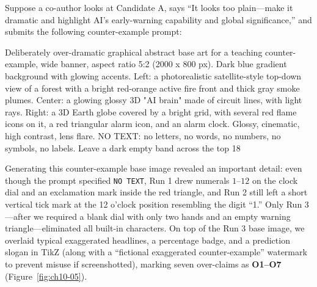 Suppose a co-author looks at Candidate A, says ``It looks too plain---make it dramatic and highlight AI's early-warning capability and global significance,'' and submits the following counter-example prompt:

\begin{Prompt}
Deliberately over-dramatic graphical abstract base art for a teaching
counter-example, wide banner, aspect ratio 5:2 (2000 x 800 px).
Dark blue gradient background with glowing accents.
Left: a photorealistic satellite-style top-down view of a forest with a bright
red-orange active fire front and thick gray smoke plumes.
Center: a glowing glossy 3D "AI brain" made of circuit lines, with light rays.
Right: a 3D Earth globe covered by a bright grid, with several red flame icons
on it, a red triangular alarm icon, and an alarm clock.
Glossy, cinematic, high contrast, lens flare.
NO TEXT: no letters, no words, no numbers, no symbols, no labels.
Leave a dark empty band across the top 18%
\end{Prompt}

Generating this counter-example base image revealed an important detail: even though the prompt specified \texttt{NO TEXT}, Run 1 drew numerals $1\text{--}12$ on the clock dial and an exclamation mark inside the red triangle, and Run 2 still left a short vertical tick mark at the 12 o'clock position resembling the digit ``1.'' Only Run 3---after we required a blank dial with only two hands and an empty warning triangle---eliminated all built-in characters. On top of the Run 3 base image, we overlaid typical exaggerated headlines, a percentage badge, and a prediction slogan in TikZ (along with a ``fictional exaggerated counter-example'' watermark to prevent misuse if screenshotted), marking seven over-claims as \textbf{O1--O7} (Figure~\ref{fig:ch10-05}).

